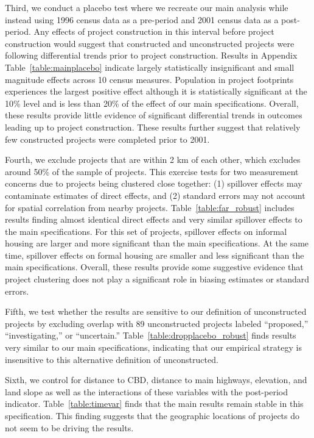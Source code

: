 \documentclass[12pt]{article}
\newcommand{\rv}{}
\begin{document}
Third, we conduct a placebo test where we recreate our main analysis while instead using 1996 census data as a pre-period and 2001 census data as a post-period.  Any effects of project construction in this interval before project construction would suggest that constructed and unconstructed projects were following differential trends prior to project construction.  Results in Appendix Table~\ref{table:mainplacebo} indicate largely statistically insignificant and small magnitude effects across 10 census measures.  Population in project footprints experiences the largest positive effect although it is statistically significant at the 10\% level and is less than 20\% of the effect of our main specifications.  Overall, these results provide little evidence of \rv{significant} differential trends in outcomes leading up to project construction.  \rv{These results further suggest that relatively few constructed projects were completed prior to 2001.}  

\rv{Fourth, we exclude projects that are within 2 km of each other, which excludes around 50\% of the sample of projects.  This exercise tests for two measurement concerns due to projects being clustered close together: (1) spillover effects may contaminate estimates of direct effects, and (2) standard errors may not account for spatial correlation from nearby projects.  Table~\ref{table:far_robust} includes results finding almost identical direct effects and very similar spillover effects to the main specifications.  For this set of projects, spillover effects on informal housing are larger and more significant than the main specifications.  At the same time, spillover effects on formal housing are smaller and less significant than the main specifications.  Overall, these results provide some suggestive evidence that project clustering does not play a significant role in biasing estimates or standard errors.}

\rv{Fifth, we test whether the results are sensitive to our definition of unconstructed projects by excluding overlap with 89 unconstructed projects labeled ``proposed,'' ``investigating,'' or ``uncertain.''  Table~\ref{table:dropplacebo_robust} finds results very similar to our main specifications, indicating that our empirical strategy is insensitive to this alternative definition of unconstructed.}

\rv{Sixth, we control for distance to CBD, distance to main highways, elevation, and land slope as well as the interactions of these variables with the post-period indicator.  Table~\ref{table:timevar} finds that the main results remain stable in this specification.  This finding suggests that the geographic locations of projects do not seem to be driving the results.}
\end{document}
